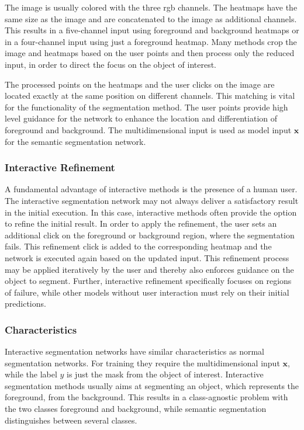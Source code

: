 The image is usually colored with the three \gls{rgb} channels.
The heatmaps have the same size as the image and are concatenated to the image as additional channels.
This results in a five-channel input using foreground and background heatmaps or in a four-channel input using just a foreground heatmap.
Many methods \cite{Man18-DEXTR} \cite{Zha20-IOG} crop the image and heatmaps based on the user points and then process only the reduced input, in order to direct the focus on the object of interest.

The processed points on the heatmaps and the user clicks on the image are located exactly at the same position on different channels.
This matching is vital for the functionality of the segmentation method.
The user points provide high level guidance for the network to enhance the location and differentiation of foreground and background.
The multidimensional input is used as model input $\textbf{x}$ for the semantic segmentation network.


\subsubsection{Interactive Refinement}
A fundamental advantage of interactive methods is the presence of a human user.
The interactive segmentation network may not always deliver a satisfactory result in the initial execution.
In this case, interactive methods often provide the option to refine the initial result.
In order to apply the refinement, the user sets an additional click on the foreground or background region, where the segmentation fails.
This refinement click is added to the corresponding heatmap and the network is executed again based on the updated input.
This refinement process may be applied iteratively by the user and thereby also enforces guidance on the object to segment.
Further, interactive refinement specifically focuses on regions of failure, while other models without user interaction must rely on their initial predictions.


\subsubsection{Characteristics}
Interactive segmentation networks have similar characteristics as normal segmentation networks.
For training they require the multidimensional input $\textbf{x}$, while the label $y$ is just the mask from the object of interest.
Interactive segmentation methods usually aims at segmenting an object, which represents the foreground, from the background.
This results in a class-agnostic problem with the two classes foreground and background, while semantic segmentation distinguishes between several classes.

